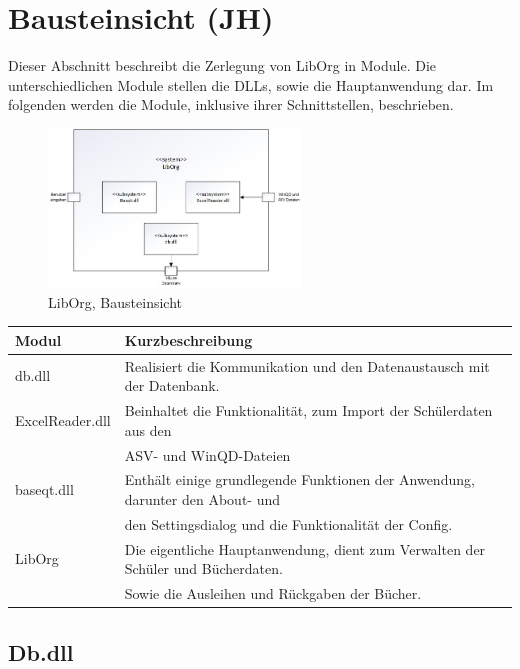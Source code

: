 \section{Bausteinsicht (JH)}
Dieser Abschnitt beschreibt die Zerlegung von LibOrg in Module. Die unterschiedlichen Module stellen die DLLs, sowie die Hauptanwendung dar. Im folgenden werden die Module, inklusive ihrer Schnittstellen, beschrieben.
\begin{figure}[H]
	\centering
		\includegraphics[width=0.60\textwidth]{figures/Bausteinschicht.jpg}
	\caption{LibOrg, Bausteinsicht}
	\label{fig:Bausteinsicht}
\end{figure}  
\begin{table}[H]
\begin{tabular}{|l|l|}
\hline
Modul           & Kurzbeschreibung                                                                                                                    \\ \hline
db.dll          & Realisiert die Kommunikation und den Datenaustausch mit der Datenbank.                                                              \\ \hline
ExcelReader.dll & Beinhaltet die Funktionalität, zum Import der Schülerdaten aus den  \\
				& ASV- und WinQD-Dateien\\ \hline
baseqt.dll      & Enthält einige grundlegende Funktionen der Anwendung, darunter den About- und  \\ 
				& den Settingsdialog und die Funktionalität der Config. \\ \hline
LibOrg          & Die eigentliche Hauptanwendung, dient zum Verwalten der Schüler und Bücherdaten.  \\  
				& Sowie die Ausleihen und Rückgaben der Bücher. \\ \hline 
\end{tabular}
\end{table}


\subsection{Db.dll}
